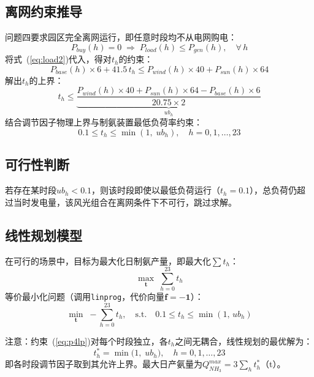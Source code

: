 \documentclass[UTF8,12pt,a4paper]{ctexart}
\begin{document}
\subsection{离网约束推导}

问题四要求园区完全离网运行，即任意时段均不从电网购电：
\begin{equation}
  P_{buy}(h) = 0 \;\Longrightarrow\; P_{load}(h) \leq P_{gen}(h), \quad \forall\,h
  \label{eq:offgrid}
\end{equation}
将式~(\ref{eq:load2})代入，得对$t_h$的约束：
\begin{equation}
  P_{base}(h)\times 6 + 41.5\,t_h \leq P_{wind}(h)\times 40 + P_{sun}(h)\times 64
  \label{eq:offgrid2}
\end{equation}
解出$t_h$的上界：
\begin{equation}
  t_h \leq \underbrace{\frac{P_{wind}(h)\times 40 + P_{sun}(h)\times 64 - P_{base}(h)\times 6}{20.75\times 2}}_{\displaystyle ub_h}
  \label{eq:ub}
\end{equation}
结合调节因子物理上界与制氨装置最低负荷率约束：
\begin{equation}
  0.1 \leq t_h \leq \min(1,\; ub_h), \quad h=0,1,\ldots,23
  \label{eq:p4bounds}
\end{equation}

\subsection{可行性判断}

若存在某时段$ub_h < 0.1$，则该时段即使以最低负荷运行（$t_h=0.1$），总负荷仍超过当时发电量，该风光组合在离网条件下不可行，跳过求解。

\subsection{线性规划模型}

在可行的场景中，目标为最大化日制氨产量，即最大化$\sum t_h$：
\begin{equation}
  \max_{\mathbf{t}}\; \sum_{h=0}^{23} t_h
  \label{eq:p4obj}
\end{equation}
等价最小化问题（调用\texttt{linprog}，代价向量$\mathbf{f}=-\mathbf{1}$）：
\begin{equation}
  \min_{\mathbf{t}}\; -\sum_{h=0}^{23} t_h, \quad \text{s.t.}\quad 0.1\leq t_h\leq \min(1,\,ub_h)
  \label{eq:p4lp}
\end{equation}

注意：约束~(\ref{eq:p4lp})对每个时段独立，各$t_h$之间无耦合，线性规划的最优解为：
\begin{equation}
  t_h^* = \min\!\bigl(1,\; ub_h\bigr), \quad h=0,1,\ldots,23
  \label{eq:p4sol}
\end{equation}
即各时段调节因子取到其允许上界。最大日产氨量为$Q_{NH_3}^{max}=3\sum_h t_h^*$（t）。
\end{document}
